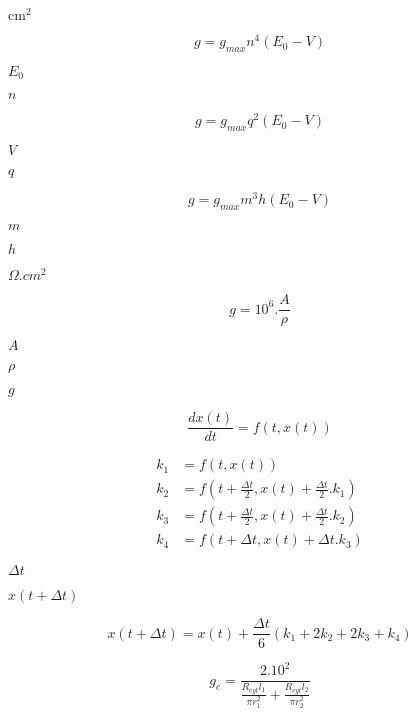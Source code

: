 \documentclass{article}
\begin{document}
$\text{cm}^2$
\pagebreak

\begin{equation} g = g_{max}n^4(E_0-V) \end{equation}
\pagebreak

$E_0$
\pagebreak

$n$
\pagebreak

\begin{equation} g = g_{max}q^2(E_0-V) \end{equation}
\pagebreak

$V$
\pagebreak

$q$
\pagebreak

\begin{equation} g = g_{max}m^3h(E_0-V) \end{equation}
\pagebreak

$m$
\pagebreak

$h$
\pagebreak

$\Omega.cm^2$
\pagebreak

\begin{equation} g = 10^6 . \frac{A}{\rho} \end{equation}
\pagebreak

$A$
\pagebreak

$\rho$
\pagebreak

$g$
\pagebreak

\begin{equation} \frac{dx(t)}{dt} = f(t, x(t)) \end{equation}
\pagebreak

\begin{align} k_1 &= f(t,x(t))\\ k_2 &= f(t+\frac{\Delta t}{2}, x(t) + \frac{\Delta t}{2}.k_1)\\ k_3 &= f(t+\frac{\Delta t}{2}, x(t) + \frac{\Delta t}{2}.k_2)\\ k_4 &= f(t+\Delta t, x(t) + \Delta t.k_3) \end{align}
\pagebreak

$\Delta t$
\pagebreak

$x(t+\Delta t)$
\pagebreak

\begin{equation} x(t+\Delta t) = x(t) + \frac{\Delta t}{6}(k_1 + 2k_2 + 2k_3+k_4) \end{equation}
\pagebreak

\begin{equation} g_c = \frac{2.10^2}{\frac{R_{cyt}l_1}{\pi r_1^2}+\frac{R_{cyt}l_2}{\pi r_2^2}} \end{equation}
\pagebreak
\end{document}
